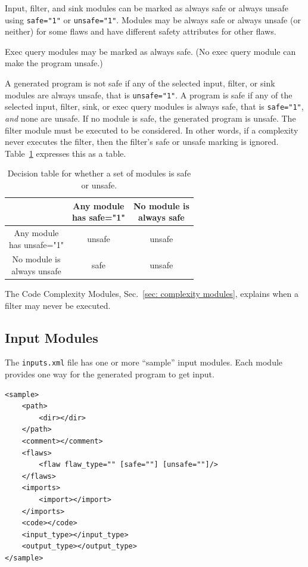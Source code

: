 Input, filter, and sink modules can be marked as always safe or always unsafe using
\verb|safe="1"| or \verb|unsafe="1"|.  Modules may be always safe or always unsafe
(or neither) for some flaws and have different safety attributes for other
flaws.

Exec query modules may be marked as always safe.  (No exec query module can make the
program unsafe.)

A generated program is not safe if any of the selected input, filter, or sink modules
are always unsafe, that is \verb|unsafe="1"|.  A program is safe if any of the
selected input, filter, sink, or exec query modules is always safe, that is
\verb|safe="1"|, \emph{and} none
are unsafe.  If no module is safe, the generated program is unsafe.
The filter module must be executed to be considered.  In other words, if
a complexity never executes the filter, then the filter's safe or unsafe marking is
ignored.  Table~\ref{tab:selection safe algorithm} expresses this as a table.

\begin{table}[H]
\centering
\caption{Decision table for whether a set of modules is safe or unsafe.}
\begin{tabular}{c|c|c|}
  & \makecell{Any module \\ has safe="1"}
  & \makecell{No module is \\ always safe} \\
\hline
\makecell{Any module \\ has unsafe="1"}  & unsafe & unsafe \\
\hline
\makecell{No module is \\ always unsafe} &   safe   & unsafe \\
\hline
\end{tabular}
\label{tab:selection safe algorithm}
\end{table}

The Code Complexity Modules, Sec.~\ref{sec: complexity modules}, explains when a
filter may never be executed.


\subsection{Input Modules}
\label{sec: input module}

The \verb|inputs.xml| file has one or more ``sample'' input modules.  Each module
provides one way for the generated program to get input.

\begin{verbatim}
<sample>
    <path>
        <dir></dir>
    </path>
    <comment></comment>
    <flaws>
        <flaw flaw_type="" [safe=""] [unsafe=""]/>
    </flaws>
    <imports>
        <import></import>
    </imports>
    <code></code>
    <input_type></input_type>
    <output_type></output_type>
</sample>
\end{verbatim}

